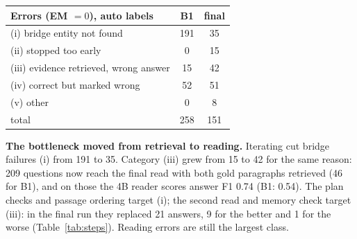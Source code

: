 \documentclass[10pt,a4paper]{article}
\begin{document}
\begin{minipage}[t]{0.47\textwidth}
\vspace{0pt}
\centering\footnotesize
\begin{tabular}{@{}lcc@{}}
\toprule
Errors (EM $=0$), auto labels & B1 & final\\
\midrule
(i) bridge entity not found & 191 & 35\\
(ii) stopped too early & 0 & 15\\
(iii) evidence retrieved, wrong answer & 15 & 42\\
(iv) correct but marked wrong & 52 & 51\\
(v) other & 0 & 8\\
\midrule
total & 258 & 151\\
\bottomrule
\end{tabular}
\label{tab:cats}
\end{minipage}\hfill
\begin{minipage}[t]{0.505\textwidth}
\vspace{0pt}
\textbf{The bottleneck moved from retrieval to reading.} Iterating cut bridge failures (i) from 191 to 35.
Category (iii) grew from 15 to 42 for the same reason: 209 questions now reach the final read with both gold
paragraphs retrieved (46 for B1), and on those the 4B reader scores answer F1 0.74 (B1: 0.54). The plan checks
and passage ordering target (i); the second read and memory check target (iii): in the final run they replaced
21 answers, 9 for the better and 1 for the worse (Table~\ref{tab:steps}). Reading errors are still the largest class.
\end{minipage}
\end{document}
